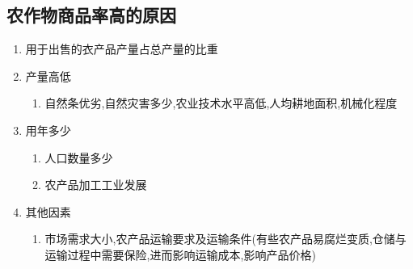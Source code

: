 \documentclass[a4paper]{article}
\begin{document}
    \subsection{农作物商品率高的原因}
    \begin{enumerate}
        \item 用于出售的衣产品产量占总产量的比重
        \item 产量高低
        \begin{enumerate}
            \item 自然条优劣,自然灾害多少,农业技术水平高低,人均耕地面积,机械化程度
        \end{enumerate}
        \item 用年多少
        \begin{enumerate}
            \item 人口数量多少
            \item 农产品加工工业发展
        \end{enumerate}
        \item 其他因素
        \begin{enumerate}
            \item 市场需求大小,农产品运输要求及运输条件(有些农产品易腐烂变质,仓储与运输过程中需要保险,进而影响运输成本,影响产品价格)
        \end{enumerate}
    \end{enumerate}
\end{document}
